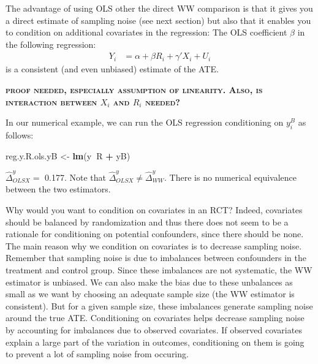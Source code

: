 \documentclass[]{book}
\newenvironment{Shaded}{\begin{snugshade}}{\end{snugshade}}
\newcommand{\KeywordTok}[1]{\textcolor[rgb]{0.13,0.29,0.53}{\textbf{#1}}}
\newcommand{\NormalTok}[1]{#1}
\newcommand{\OperatorTok}[1]{\textcolor[rgb]{0.81,0.36,0.00}{\textbf{#1}}}
\newcommand{\StringTok}[1]{\textcolor[rgb]{0.31,0.60,0.02}{#1}}
\theoremstyle{definition}
\theoremstyle{definition}
\theoremstyle{definition}
\theoremstyle{remark}
\let\BeginKnitrBlock\begin \let\EndKnitrBlock\end
\begin{document}
The advantage of using OLS other the direct WW comparison is that it gives you a direct estimate of sampling noise (see next section) but also that it enables you to condition on additional covariates in the regression:
The OLS coefficient \(\beta\) in the following regression:
\begin{align*}
    Y_i &  = \alpha +  \beta R_i + \gamma' X_i + U_i
    \end{align*}
is a consistent (and even unbiased) estimate of the ATE.

\textbf{\textsc{proof needed, especially assumption of linearity. Also, is interaction between \(X_i\) and \(R_i\) needed?}}

\BeginKnitrBlock{example}
\protect\hypertarget{exm:unnamed-chunk-72}{}{\label{exm:unnamed-chunk-72} }In our numerical example, we can run the OLS regression conditioning on \(y_i^B\) as follows:
\EndKnitrBlock{example}

\begin{Shaded}
\begin{Highlighting}[]
\NormalTok{reg.y.R.ols.yB <-}\StringTok{ }\KeywordTok{lm}\NormalTok{(y}\OperatorTok{~}\NormalTok{R }\OperatorTok{+}\StringTok{ }\NormalTok{yB)}
\end{Highlighting}
\end{Shaded}

\(\hat{\Delta}^y_{OLSX}=\) 0.177.
Note that \(\hat{\Delta}^y_{OLSX}\neq\hat{\Delta}^y_{WW}\).
There is no numerical equivalence between the two estimators.

\BeginKnitrBlock{remark}
\iffalse{} {Remark. } \fi{}Why would you want to condition on covariates in an RCT?
Indeed, covariates should be balanced by randomization and thus there does not seem to be a rationale for conditioning on potential confounders, since there should be none.
The main reason why we condition on covariates is to decrease sampling noise.
Remember that sampling noise is due to imbalances between confounders in the treatment and control group.
Since these imbalances are not systematic, the WW estimator is unbiased.
We can also make the bias due to these unbalances as small as we want by choosing an adequate sample size (the WW estimator is consistent).
But for a given sample size, these imbalances generate sampling noise around the true ATE.
Conditioning on covariates helps decrease sampling noise by accounting for imbalances due to observed covariates.
If observed covariates explain a large part of the variation in outcomes, conditioning on them is going to prevent a lot of sampling noise from occuring.
\EndKnitrBlock{remark}
\end{document}
